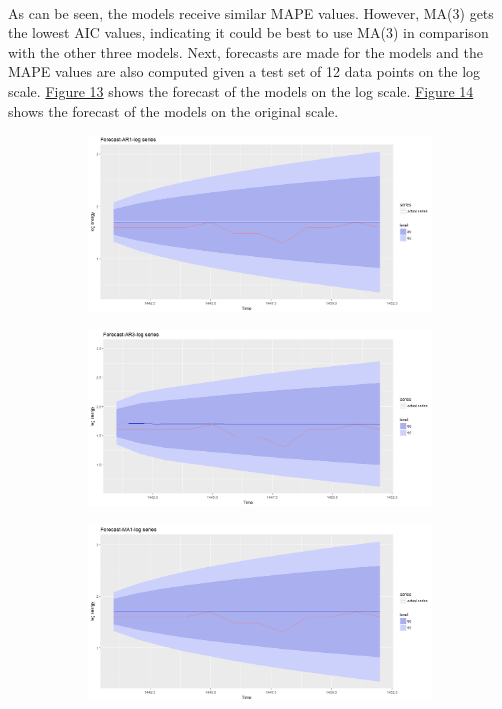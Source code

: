 \documentclass[12pt]{article}
\begin{document}
\paragraph{}
As can be seen, the models receive similar MAPE values. However, MA(3) gets the lowest AIC values, indicating it could be best to use MA(3) in comparison with the other three models. Next, forecasts are made for the models and the MAPE values are also computed given a test set of 12 data points on the log scale. \href{figure13}{Figure 13} shows the forecast of the models on the log scale. \href{figure14}{Figure 14} shows the forecast of the models on the original scale.
\begin{figure}[H]
  \centering
  \begin{subfigure}[b]{0.49\linewidth}
    \includegraphics[width=\linewidth]{figure13-1.png}
  \end{subfigure}
  \begin{subfigure}[b]{0.49\linewidth}
    \includegraphics[width=\linewidth]{figure13-2.png}
  \end{subfigure}
  \begin{subfigure}[b]{0.49\linewidth}
    \includegraphics[width=\linewidth]{figure13-3.png}

\end{subfigure}
\end{figure}
\end{document}
